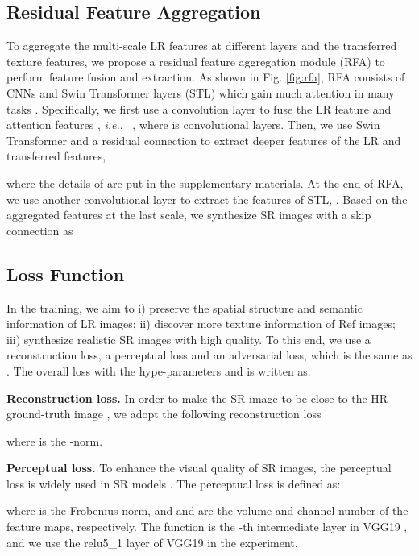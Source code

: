 \documentclass[runningheads]{llncs}
\def\ie{\mbox{\textit{i.e.}, }}
\begin{document}
\subsection{Residual Feature Aggregation}
To aggregate the multi-scale LR features at different layers and the transferred texture features, we propose a residual feature aggregation module (RFA) to perform feature fusion and extraction.
As shown in Fig. \ref{fig:rfa}, RFA consists of CNNs and Swin Transformer layers (STL) \cite{liu2021swin} which gain much attention in many tasks \cite{liang2021swinir,cao2021swin,liu2021video}.
Specifically, we first use a convolution layer to fuse the LR feature  and attention features , \ie
,
where  is convolutional layers. 
Then, we use Swin Transformer and a residual connection to extract deeper features of the LR and transferred features,

where the details of  are put in the supplementary materials.
At the end of RFA, we use another convolutional layer to extract the features of STL, 
.  
Based on the aggregated features  at the last scale, we synthesize SR images with a skip connection as 


\subsection{Loss Function}
In the training, we aim to i) preserve the spatial structure and semantic information of LR images; ii) discover more texture information of Ref images; iii) synthesize realistic SR images with high quality.
To this end, we use a reconstruction loss, a perceptual loss and an adversarial loss, which is the same as \cite{yang2020learning,jiang2021robust}.
The overall loss with the hype-parameters  and  is written as:



\noindent\textbf{Reconstruction loss.}
In order to make the SR image  to be close to the HR ground-truth image , we adopt the following reconstruction loss

where  is the -norm.

\noindent\textbf{Perceptual loss.}
To enhance the visual quality of SR images, the perceptual loss is widely used in SR models \cite{zhang2019image,jiang2021robust}.
The perceptual loss is defined as:

where  is the Frobenius norm, and  and  are the volume and channel number of the feature maps, respectively.
The function  is the -th intermediate layer in VGG19 \cite{simonyan2014very}, and we use the relu5\_1 layer of VGG19 in the experiment.
\end{document}
